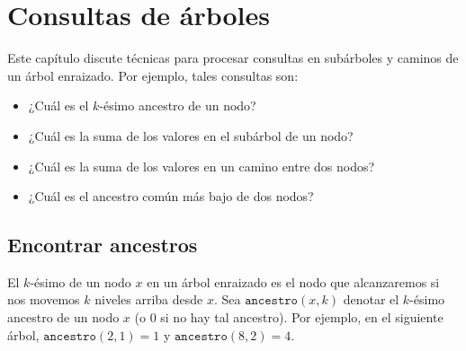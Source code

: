 \chapter{Consultas de árboles}


Este capítulo discute técnicas para
procesar consultas en
subárboles y caminos de un árbol enraizado.
Por ejemplo, tales consultas son:

\begin{itemize}
\item ¿Cuál es el $k$-ésimo ancestro de un nodo?
\item ¿Cuál es la suma de los valores en el subárbol de un nodo?
\item ¿Cuál es la suma de los valores en un camino entre dos nodos?
\item ¿Cuál es el ancestro común más bajo de dos nodos?
\end{itemize}

\section{Encontrar ancestros}


El $k$-ésimo  de un nodo $x$ en un árbol enraizado
es el nodo que alcanzaremos si nos movemos $k$
niveles arriba desde $x$.
Sea $\texttt{ancestro}(x,k)$ denotar el $k$-ésimo ancestro de un nodo $x$
(o $0$ si no hay tal ancestro).
Por ejemplo, en el siguiente árbol,
$\texttt{ancestro}(2,1)=1$ y $\texttt{ancestro}(8,2)=4$.
\begin{center}
\end{center}

